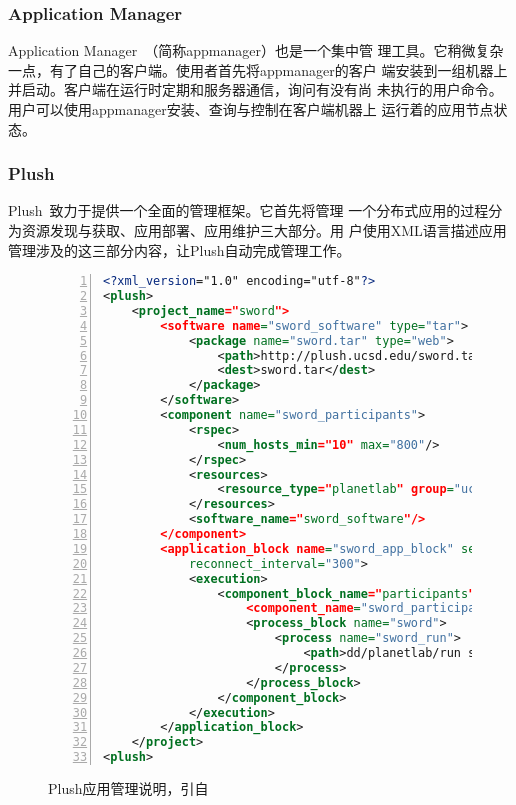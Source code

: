 \subsubsection*{Application Manager}

Application Manager~\cite{appmanager}（简称appmanager）也是一个集中管
理工具。它稍微复杂一点，有了自己的客户端。使用者首先将appmanager的客户
端安装到一组机器上并启动。客户端在运行时定期和服务器通信，询问有没有尚
未执行的用户命令。用户可以使用appmanager安装、查询与控制在客户端机器上
运行着的应用节点状态。

\subsubsection*{Plush}

Plush~\cite{plush}致力于提供一个全面的管理框架。它首先将管理
一个分布式应用的过程分为资源发现与获取、应用部署、应用维护三大部分。用
户使用XML语言描述应用管理涉及的这三部分内容，让Plush自动完成管理工作。

\begin{figure}
\centering
\begin{lstlisting}[language=XML,numbers=left]
<?xml_version="1.0" encoding="utf-8"?>
<plush>
    <project_name="sword">
        <software name="sword_software" type="tar">
            <package name="sword.tar" type="web">
                <path>http://plush.ucsd.edu/sword.tar</path>
                <dest>sword.tar</dest>
            </package>
        </software>
        <component name="sword_participants">
            <rspec>
                <num_hosts_min="10" max="800"/>
            </rspec>
            <resources>
                <resource_type="planetlab" group="ucsd_sword"/>
            </resources>
            <software_name="sword_software"/>
        </component>
        <application_block name="sword_app_block" service="1"
            reconnect_interval="300">
            <execution>
                <component_block_name="participants">
                    <component_name="sword_participants"/>
                    <process_block name="sword">
                        <process name="sword_run">
                            <path>dd/planetlab/run sword</path>
                        </process>
                    </process_block>
                </component_block>
            </execution>
        </application_block>
    </project>
<plush>
\end{lstlisting}
\caption{Plush应用管理说明，引自~\cite{plush}}
\label{fig:plush_spec}
\end{figure}


